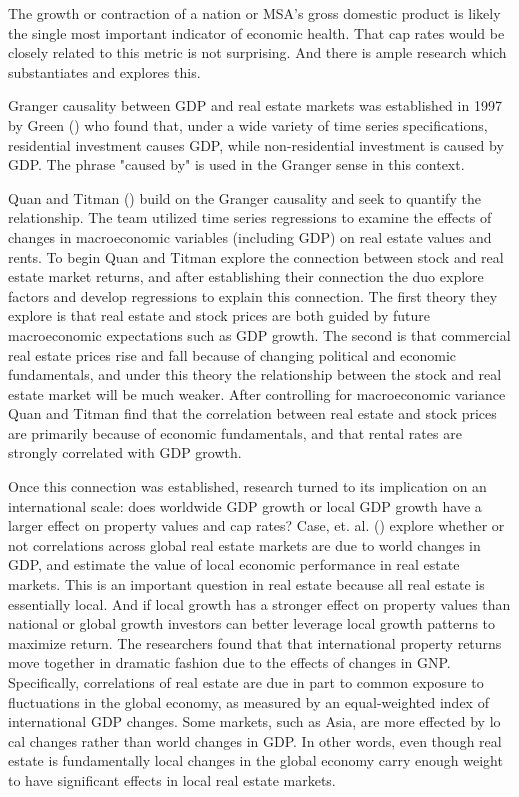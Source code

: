 The growth or contraction of a nation or MSA's gross domestic product is likely the single most important indicator of economic health. That cap rates would be closely related to this metric is not surprising. And there is ample research which substantiates and explores this.

Granger causality between GDP and real estate markets was established in 1997 by Green (\citeyear{green1997follow}) who found that, under a wide variety of time series specifications, residential investment causes GDP, while non-residential investment is caused by GDP. The phrase "caused by" is used in the Granger sense in this context. 

Quan and Titman (\citeyear{quan1997commercial}) build on the Granger causality and seek to quantify the relationship. The team utilized time series regressions to examine the effects of changes in macroeconomic variables (including GDP) on real estate values and rents. To begin Quan and Titman explore the connection between stock and real estate market returns, and after establishing their connection the duo explore factors and develop regressions to explain this connection. The first theory they explore is that real estate and stock prices are both guided by future macroeconomic expectations such as GDP growth. The second is that commercial real estate prices rise and fall because of changing political and economic fundamentals, and under this theory the relationship between the stock and real estate market will be much weaker. After controlling for macroeconomic variance Quan and Titman find that the correlation between real estate and stock prices are primarily because of economic fundamentals, and that rental rates are strongly correlated with GDP growth.

Once this connection was established, research turned to its implication on an international scale: does worldwide GDP growth or local GDP growth have a larger effect on property values and cap rates? Case, et. al. (\citeyear{case2000global}) explore whether or not correlations across global real estate markets are due to world changes in GDP, and estimate the value of local economic performance in real estate markets. This is an important question in real estate because all real estate is essentially local. And if local growth has a stronger effect on property values than national or global growth investors can better leverage local growth patterns to maximize return. The researchers found that that international property returns move together in dramatic fashion due to the effects of changes in GNP. Specifically, correlations of real estate are due in part to common exposure to fluctuations in the global economy, as measured by an equal-weighted index of international GDP changes. Some markets, such as Asia, are more effected by lo cal changes rather than world changes in GDP. In other words, even though real estate is fundamentally local changes in the global economy carry enough weight to have significant effects in local real estate markets.

